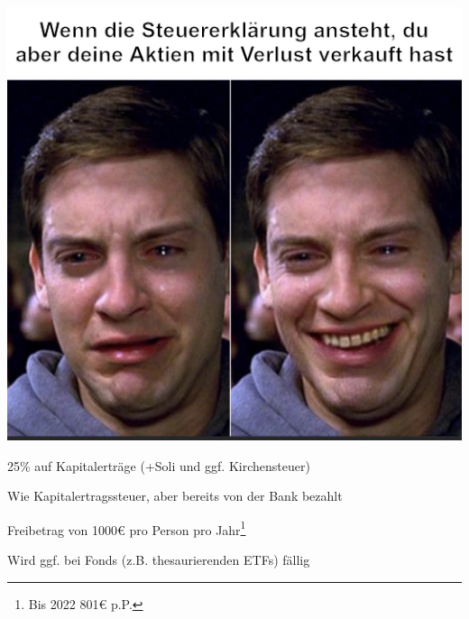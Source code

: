 \documentclass{beamer}
\begin{document}
			\begin{frame}
				\begin{center}
					\vspace{-0.5cm}
					\includegraphics[height=0.85\textheight]{images/taxes-peter-parker}
				\end{center}
			\end{frame}
		
			\begin{frame}
				\begin{description}[labelwidth=0cm,align=right]
					\item[Kapitalertragssteuer] 25\% auf Kapitalerträge (+Soli und ggf. Kirchensteuer)\pause
					\item[Abgeltungssteuer] Wie Kapitalertragssteuer, aber bereits von der Bank bezahlt\pause
					\item[Sparerpauschbetrag] Freibetrag von 1000€ pro Person pro Jahr\footnote{Bis 2022 801€ p.P.}\pause
					\item[Vorabpauschale] Wird ggf. bei Fonds (z.B. thesaurierenden ETFs) fällig
				\end{description}
			\end{frame}
		
\end{document}
